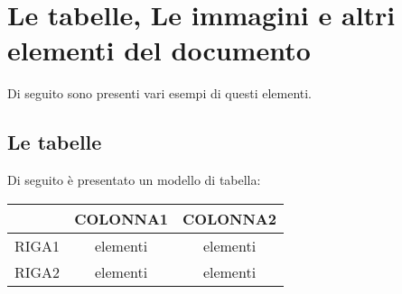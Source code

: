 \section{Le tabelle, Le immagini e altri elementi del documento}

Di seguito sono presenti vari esempi\cite{latex2e} di questi elementi.

\subsection{Le tabelle}

Di seguito è presentato un modello di tabella:

\begin{center}
	\begin{tabular}{c|c c}
		\hline \hline
		& COLONNA1&COLONNA2\\
		\hline \hline
		RIGA1& elementi & elementi\\
		RIGA2& elementi & elementi\\
		\hline
	\end{tabular}
\end{center}
